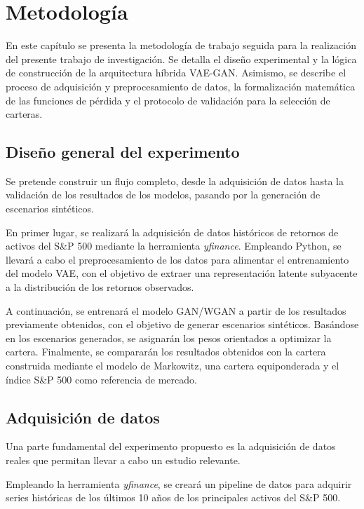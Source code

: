 \clearpage
\chapter{Metodología}

En este capítulo se presenta la metodología de trabajo seguida para la realización del presente trabajo de investigación. Se detalla el diseño experimental y la lógica de construcción de la arquitectura híbrida VAE-GAN. Asimismo, se describe el proceso de adquisición y preprocesamiento de datos, la formalización matemática de las funciones de pérdida y el protocolo de validación para la selección de carteras.

\section{Diseño general del experimento}

Se pretende construir un flujo completo, desde la adquisición de datos hasta la validación de los resultados de los modelos, pasando por la generación de escenarios sintéticos.

En primer lugar, se realizará la adquisición de datos históricos de retornos de activos del S\&P 500 mediante la herramienta \textit{yfinance}. Empleando Python, se llevará a cabo el preprocesamiento de los datos para alimentar el entrenamiento del modelo VAE, con el objetivo de extraer una representación latente subyacente a la distribución de los retornos observados.

A continuación, se entrenará el modelo GAN/WGAN a partir de los resultados previamente obtenidos, con el objetivo de generar escenarios sintéticos. Basándose en los escenarios generados, se asignarán los pesos orientados a optimizar la cartera. Finalmente, se compararán los resultados obtenidos con la cartera construida mediante el modelo de Markowitz, una cartera equiponderada y el índice S\&P 500 como referencia de mercado.

\section{Adquisición de datos}

Una parte fundamental del experimento propuesto es la adquisición de datos reales que permitan llevar a cabo un estudio relevante.

Empleando la herramienta \textit{yfinance}, se creará un pipeline de datos para adquirir series históricas de los últimos 10 años de los principales activos del S\&P 500.

